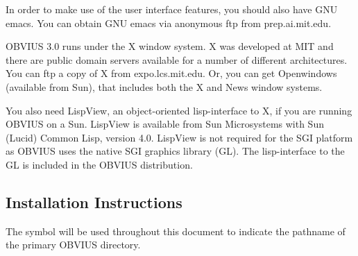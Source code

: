 In order to make use of the user interface features, you should also
have GNU emacs. You can obtain GNU emacs via anonymous ftp from
prep.ai.mit.edu.

OBVIUS 3.0 runs under the X window system.  X was developed at MIT and
there are public domain servers available for a number of different
architectures.  You can ftp a copy of X from expo.lcs.mit.edu.  Or,
you can get Openwindows (available from Sun), that includes both the X
and News window systems.

You also need LispView, an object-oriented lisp-interface to X, if you
are running OBVIUS on a Sun.  LispView is available from Sun
Microsystems with Sun (Lucid) Common Lisp, version 4.0.  LispView is
not required for the SGI platform as OBVIUS uses the native SGI
graphics library (GL).  The lisp-interface to the GL is included in
the OBVIUS distribution.


\subsection{Installation Instructions}

The symbol  will be used throughout this document to
indicate the pathname of the primary OBVIUS directory.

